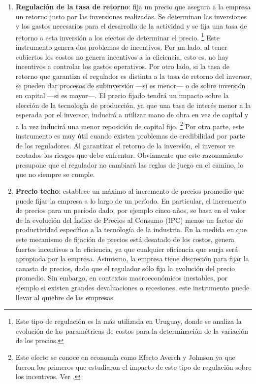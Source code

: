 \documentclass[
  12pt,
  spanish,
]{book}
\begin{document}
\begin{enumerate}
\def\labelenumi{\arabic{enumi}.}
\item
  \textbf{Regulación de la tasa de retorno}: fija un precio que asegura
  a la empresa un retorno justo por las inversiones realizadas. Se
  determinan las inversiones y los gastos necesarios para el desarrollo
  de la actividad y se fija una tasa de retorno a esta inversión a los
  efectos de determinar el precio. \footnote{Este tipo de regulación es
    la más utilizada en Uruguay, donde se analiza la evolución de las
    paramétricas de costos para la determinación de la variación de los
    precios.} Este instrumento genera dos problemas de incentivos. Por
  un lado, al tener cubiertos los costos no genera incentivos a la
  eficiencia, esto es, no hay incentivos a controlar los gastos
  operativos. Por otro lado, si la tasa de retorno que garantiza el
  regulador es distinta a la tasa de retorno del inversor, se pueden dar
  procesos de subinversión ---si es menor--- o de sobre inversión en
  capital ---si es mayor---. El precio fijado tendrá un impacto sobre la
  elección de la tecnología de producción, ya que una tasa de interés
  menor a la esperada por el inversor, inducirá a utilizar mano de obra
  en vez de capital y a la vez inducirá una menor reposición de capital
  fijo. \footnote{Este efecto se conoce en economía como Efecto Averch y
    Johnson ya que fueron los primeros que estudiaron el impacto de este
    tipo de regulación sobre los incentivos. Ver \citet{Averch1962}.}
  Por otra parte, este instrumento es muy útil cuando existen problemas
  de credibilidad por parte de los reguladores. Al garantizar el retorno
  de la inversión, el inversor ve acotados los riesgos que debe
  enfrentar. Obviamente que este razonamiento presupone que el regulador
  no cambiará las reglas de juego en el camino, lo que no siempre se
  cumple.
\item
  \textbf{Precio techo}: establece un máximo al incremento de precios
  promedio que puede fijar la empresa a lo largo de un período. En
  particular, el incremento de precios para un período dado, por ejemplo
  cinco años, se basa en el valor de la evolución del Índice de Precios
  al Consumo (IPC) menos un factor de productividad específico a la
  tecnología de la industria. En la medida en que este mecanismo de
  fijación de precios está desatado de los costos, genera fuertes
  incentivos a la eficiencia, ya que cualquier eficiencia que surja será
  apropiada por la empresa. Asimismo, la empresa tiene discreción para
  fijar la canasta de precios, dado que el regulador sólo fija la
  evolución del precio promedio. Sin embargo, en contextos
  macroeconómicos inestables, por ejemplo si existen grandes
  devaluaciones o recesiones, este instrumento puede llevar al quiebre
  de las empresas.
\end{enumerate}
\end{document}
